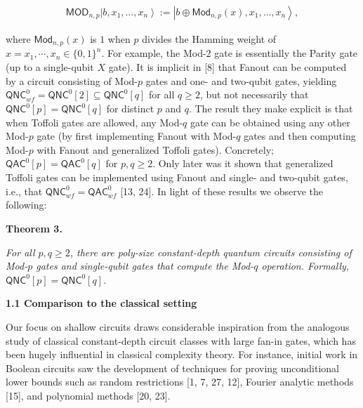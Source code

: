 \documentclass[10pt,a4paper]{article}
\begin{document}
\[\begin{gathered}
\mathsf{MOD}_{n,p}\left|b,x_{1},\ldots,x_{n}\right\rangle:=\left|b\oplus{\mathsf{Mod}}_{n,p}(x),x_{1},\ldots,x_{n}\right\rangle,
\end{gathered}\]


where ${\mathsf{Mod}}_{n,p}(x)$ is $1$ when $p$ divides the Hamming weight of $x=x_{1},\cdots,x_{n}\in\{0,1\}^{n}$. For example, the Mod-$2$ gate is essentially the Parity gate (up to a single-qubit $X$ gate). It is implicit in [8] that Fanout can be computed by a circuit consisting of Mod-$p$ gates and one- and two-qubit gates, yielding ${\mathsf{QNC}}^{0}_{wf}={\mathsf{QNC}}^{0}[2]\subseteq{\mathsf{QNC}}^{0}[q]$ for all $q\geq 2$, but not necessarily that ${\mathsf{QNC}}^{0}[p]={\mathsf{QNC}}^{0}[q]$ for distinct $p$ and $q$. The result they make explicit is that when Toffoli gates are allowed, any Mod-$q$ gate can be obtained using any other Mod-$p$ gate (by first implementing Fanout with Mod-$q$ gates and then computing Mod-$p$ with Fanout and generalized Toffoli gates). Concretely; ${\mathsf{QAC}}^{0}[p]={\mathsf{QAC}}^{0}[q]$ for $p,q\geq 2$. Only later was it shown that generalized Toffoli gates can be implemented using Fanout and single- and two-qubit gates, i.e., that ${\mathsf{QNC}}^{0}_{wf}={\mathsf{QAC}}^{0}_{wf}$ [13, 24]. In light of these results we observe the following:\par





\par\medskip\noindent\textbf{
\textbf{Theorem 3}\textbf{.}
}\par



\emph{For all $p,q\geq 2$, there are poly-size constant-depth quantum circuits consisting of Mod-$p$ gates and single-qubit gates that compute the Mod-$q$ operation. Formally, ${\mathsf{QNC}}^{0}[p]={\mathsf{QNC}}^{0}[q]$.}\par






\par\medskip\noindent\textbf{
1.1 Comparison to the classical setting}\par




Our focus on shallow circuits draws considerable inspiration from the analogous study of classical constant-depth circuit classes with large fan-in gates, which has been hugely influential in classical complexity theory. For instance, initial work in Boolean circuits saw the development of techniques for proving unconditional lower bounds such as random restrictions [1, 7, 27, 12], Fourier analytic methods [15], and polynomial methods [20, 23].\par
\end{document}
